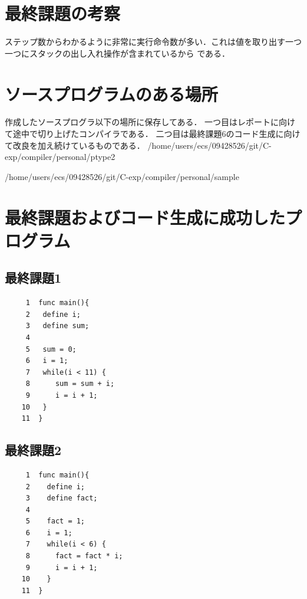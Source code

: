 \documentclass[a4paper,11pt]{jarticle}
\begin{document}
{\begin{verbatim}
\end{verbatim}
\section{最終課題の考察}
ステップ数からわかるように非常に実行命令数が多い．これは値を取り出す一つ一つにスタックの出し入れ操作が含まれているから
である．
\section{ソースプログラムのある場所}

作成したソースプログラ以下の場所に保存してある．
一つ目はレポートに向けて途中で切り上げたコンパイラである．
二つ目は最終課題6のコード生成に向けて改良を加え続けているものである．
/home/users/ecs/09428526/git/C-exp/compiler/personal/ptype2

/home/users/ecs/09428526/git/C-exp/compiler/personal/sample

\section{最終課題およびコード生成に成功したプログラム}
\subsection{最終課題1}
{\fontsize{10pt}{11pt} \selectfont
\begin{verbatim}
     1	func main(){
     2	 define i; 
     3	 define sum;
     4	
     5	 sum = 0;
     6	 i = 1;
     7	 while(i < 11) {
     8	    sum = sum + i;
     9	    i = i + 1;
    10	 }
    11	}
\end{verbatim}
}
\subsection{最終課題2}
{\fontsize{10pt}{11pt} \selectfont
\begin{verbatim}
     1	func main(){
     2	  define i;
     3	  define fact;
     4	  
     5	  fact = 1;
     6	  i = 1;
     7	  while(i < 6) {
     8	    fact = fact * i;
     9	    i = i + 1;
    10	  }
    11	}
\end{verbatim}
}
}
\end{document}
